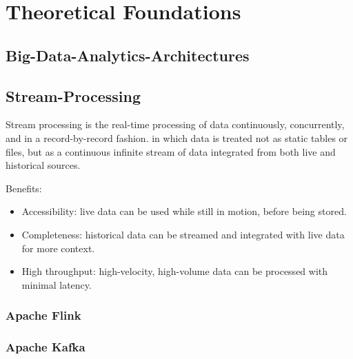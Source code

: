 \chapter{Theoretical Foundations}
\section{Big-Data-Analytics-Architectures}
\section{Stream-Processing}
Stream processing is the real-time processing of data continuously, concurrently, and in a record-by-record fashion.
in which data is treated not as static tables or files, but as a continuous infinite stream of data integrated from both live and
historical sources.

Benefits:
\begin{itemize}
	\item Accessibility: live data can be used while still in motion, before being stored.
	\item Completeness: historical data can be streamed and integrated with live data for more context.
	\item High throughput: high-velocity, high-volume data can be processed with minimal latency.
\end{itemize}
\subsection{Apache Flink}
\subsection{Apache Kafka}